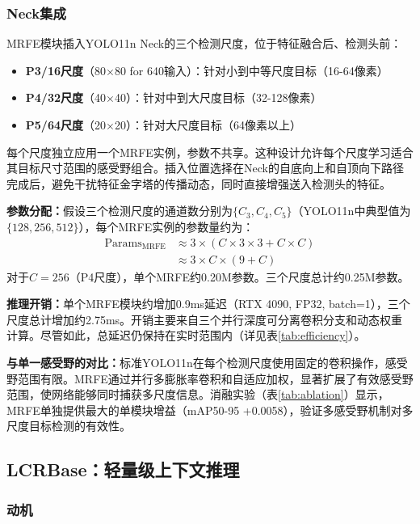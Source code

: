 \documentclass[journal]{IEEEtran}
\begin{document}
\subsubsection{Neck集成}

MRFE模块插入YOLO11n Neck的三个检测尺度，位于特征融合后、检测头前：
\begin{itemize}
    \item \textbf{P3/16尺度}（80$\times$80 for 640输入）：针对小到中等尺度目标（16-64像素）
    \item \textbf{P4/32尺度}（40$\times$40）：针对中到大尺度目标（32-128像素）
    \item \textbf{P5/64尺度}（20$\times$20）：针对大尺度目标（64像素以上）
\end{itemize}

每个尺度独立应用一个MRFE实例，参数不共享。这种设计允许每个尺度学习适合其目标尺寸范围的感受野组合。插入位置选择在Neck的自底向上和自顶向下路径完成后，避免干扰特征金字塔的传播动态，同时直接增强送入检测头的特征。

\textbf{参数分配：}假设三个检测尺度的通道数分别为$\{C_3, C_4, C_5\}$（YOLO11n中典型值为$\{128, 256, 512\}$），每个MRFE实例的参数量约为：
\begin{equation}
\begin{split}
\text{Params}_{\text{MRFE}} &\approx 3 \times (C \times 3 \times 3 + C \times C) \\
&\approx 3 \times C \times (9 + C)
\end{split}
\end{equation}
对于$C=256$（P4尺度），单个MRFE约0.20M参数。三个尺度总计约0.25M参数。

\textbf{推理开销：}单个MRFE模块约增加0.9ms延迟（RTX 4090, FP32, batch=1），三个尺度总计增加约2.75ms。开销主要来自三个并行深度可分离卷积分支和动态权重计算。尽管如此，总延迟仍保持在实时范围内（详见表\ref{tab:efficiency}）。

\textbf{与单一感受野的对比：}标准YOLO11n在每个检测尺度使用固定的卷积操作，感受野范围有限。MRFE通过并行多膨胀率卷积和自适应加权，显著扩展了有效感受野范围，使网络能够同时捕获多尺度信息。消融实验（表\ref{tab:ablation}）显示，MRFE单独提供最大的单模块增益（mAP50-95 +0.0058），验证多感受野机制对多尺度目标检测的有效性。


\subsection{LCRBase：轻量级上下文推理}
\label{subsec:lcrbase}

\subsubsection{动机}
\end{document}
